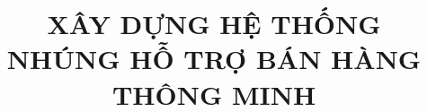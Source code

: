 \documentclass[final]{thesis}
\title{XÂY DỰNG HỆ THỐNG NHÚNG HỖ TRỢ BÁN HÀNG THÔNG MINH}
\begin{document}
\coverpage%

\frontmatter%





\begin{KeepFromToc}
\tableofcontents
\end{KeepFromToc}

\mainmatter%










\nocite{*}
\end{document}
